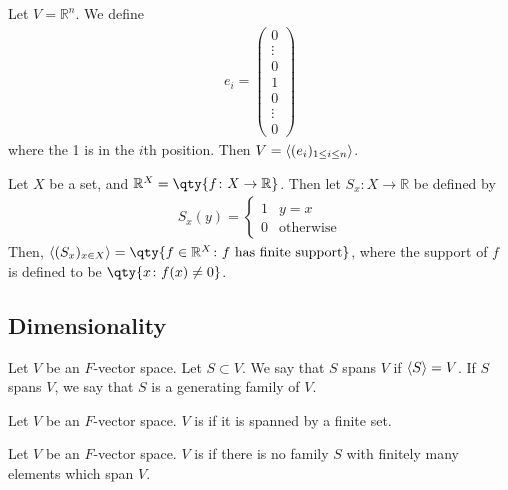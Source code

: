 \begin{example}
    Let $V = \mathbb R^n$.
    We define
    \begin{align*}
        e_i = \begin{pmatrix}
            0 \\ \vdots \\ 0 \\ 1 \\ 0 \\ \vdots \\ 0
        \end{pmatrix}
    \end{align*}
    where the 1 is in the $i$th position.
    Then $V = \langle{} (e_i)_{1 \leq i \leq n} \rangle$.
\end{example}
\begin{example}
    Let $X$ be a set, and $\mathbb R^X = \qty{f \colon X \to \mathbb R}$.
    Then let $S_x \colon X \to \mathbb R$ be defined by
    \begin{align*}
        S_x(y) = \begin{cases}
            1 & y = x            \\
            0 & \text{otherwise}
        \end{cases}
    \end{align*}
    Then, $\genset{(S_x)_{x \in X}} = \qty{f \in \mathbb R^X \colon f \text{ has finite support}}$,
    where the support of $f$ is defined to be $\qty{x \colon f(x) \neq 0}$.
\end{example}

\subsection{Dimensionality}
\begin{definition}
    Let $V$ be an $F$-vector space.
    Let $S \subset V$.
    We say that $S$ spans $V$ if $\langle{} S \rangle = V$.
    If $S$ spans $V$, we say that $S$ is a generating family of $V$.
\end{definition}

\begin{definition}
    Let $V$ be an $F$-vector space.
    $V$ is  if it is spanned by a finite set.
\end{definition}

\begin{definition}
    Let $V$ be an $F$-vector space.
    $V$ is  if there is no family $S$  with finitely many elements which span $V$.
\end{definition}

